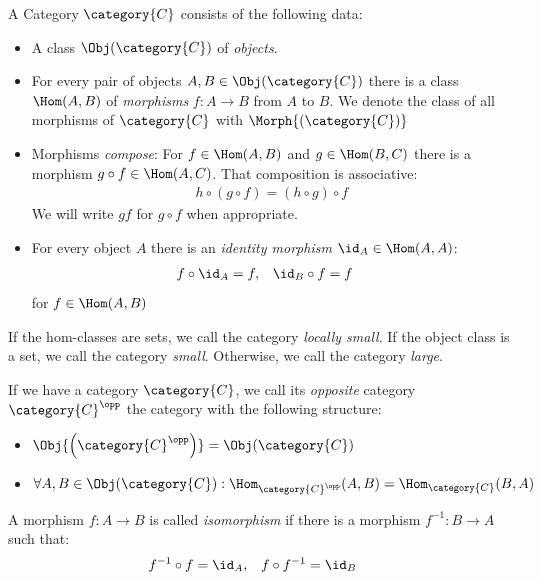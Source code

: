 \documentclass[DIN, pagenumber=false, fontsize=11pt, parskip=half, colorinlistoftodos, svgnames]{scrartcl}
\begin{document}
	\begin{definition}[Category]
		\label{def: cat}
		A Category $\category{C}$ consists of the following data: 
		\begin{itemize}
			\item 
				A class $\Obj(\category{C})$ of \emph{objects}.
			\item 
				For every pair of objects $A, B \in \Obj(\category{C})$ there is a class $\Hom(A, B)$ of \emph{morphisms} $f: A \rightarrow B$ from $A$ to $B$. 
				We denote the class of all morphisms of $\category{C}$ with $\Morph{(\category{C})}$
			\item 
				Morphisms \emph{compose}: For $f \in \Hom(A, B)$ and $g \in \Hom(B, C)$ there is a morphism $g \circ  f \in \Hom(A, C)$. 
				That composition is associative: 
				\begin{align*}
					h \circ (g \circ f) = (h \circ g) \circ f
				\end{align*}
				We will write $gf$ for $g\circ f$ when appropriate.
			\item 
				For every object $A$ there is an \emph{identity morphism} $\id_A \in \Hom(A, A)$:
				\begin{align*}
					f \circ \id_A 
					&= f , 
					&
					\id_B \circ f 
					&= f
				\end{align*}
				for $f \in \Hom(A, B)$
		\end{itemize}
		If the hom-classes are sets, we call the category \emph{locally small}. If the object class is a set, we call the category \emph{small}. Otherwise, we call the category \emph{large}.
		
		If we have a category $\category{C} $, we call its \emph{opposite} category $\category{C}^\opp $ the category with the following structure:
		\begin{itemize}
			\item $\Obj{\left(\category{C}^\opp \right)} = \Obj(\category{C}) $
			\item $\forall A, B \in \Obj(\category{C}): 
			\Hom_{\category{C}^\opp }(A,B) = \Hom_{\category{C}}(B,A)$
		\end{itemize}
	\end{definition}
	
	\begin{definition}[Isomorphism]
		A morphism $f: A \rightarrow B$ is called \emph{isomorphism} if there is a morphism $f^{-1}: B \rightarrow A$ such that:
		\begin{align*}
			f^{-1} \circ f 
			&= \id_A , 
			&
			f \circ f^{-1} 
			&= \id_B
		\end{align*}
	\end{definition}
	
\end{document}
